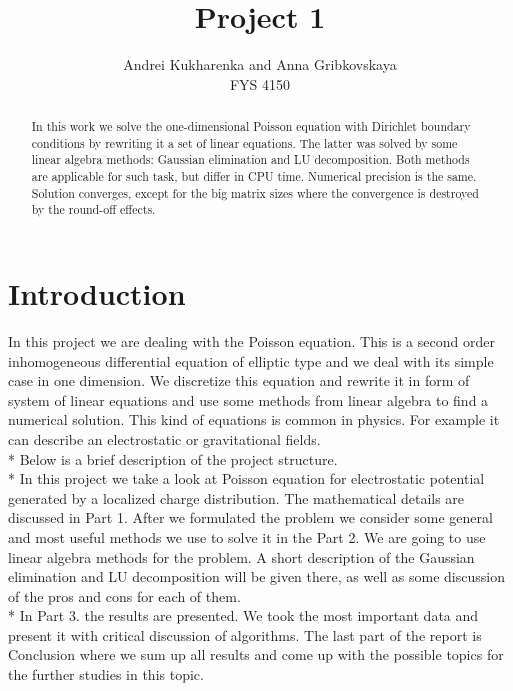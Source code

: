 \documentclass[10pt]{article}
\begin{document}
\setlength\parindent{1pt}
\title{Project 1}
\author{Andrei Kukharenka and Anna Gribkovskaya \\  
FYS 4150 
}

\maketitle
\begin{abstract}
In this work we solve the one-dimensional Poisson equation with Dirichlet boundary conditions by rewriting it a set of linear equations. The latter was solved by some linear algebra methods: Gaussian elimination and LU decomposition. Both methods are applicable for such task, but differ in CPU time. Numerical precision is the same. Solution converges, except for the big matrix sizes where the convergence is destroyed by the round-off effects.
\end{abstract}
\clearpage 


\section{Introduction}
In this project we are dealing with the Poisson equation. This is a second order inhomogeneous differential equation of elliptic type and we deal with its simple case in one dimension. We discretize this equation and rewrite it in form of system of linear equations and use some methods from linear algebra to find a numerical solution. This kind of equations is common in physics. For example it can describe an electrostatic or gravitational fields.  \\* 
Below is a brief description of the project structure. \\* 
In this project we take a look at Poisson equation for electrostatic potential generated by a localized charge distribution. The mathematical details are discussed in Part 1. After we formulated the problem we consider some general and most useful methods we use to solve it in the Part 2. We are going to use linear algebra methods for the problem. A short description of the Gaussian elimination and LU decomposition will be given there, as well as some discussion of the pros and cons for each of them.\\* 
In Part 3. the results are presented. We took the most important data and present it with critical discussion of algorithms. The last part of the report is Conclusion where we sum up all results and come up with the possible topics for the further studies  in this topic. 
\end{document}
